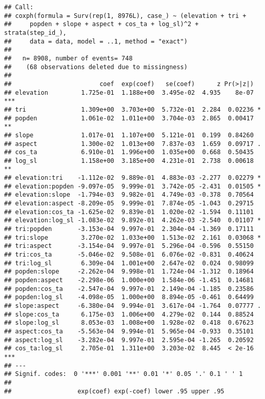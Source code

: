 \documentclass[
]{article}
\begin{document}
\begin{verbatim}
## Call:
## coxph(formula = Surv(rep(1, 8976L), case_) ~ (elevation + tri + 
##     popden + slope + aspect + cos_ta + log_sl)^2 + strata(step_id_), 
##     data = data, model = ..1, method = "exact")
## 
##   n= 8908, number of events= 748 
##    (68 observations deleted due to missingness)
## 
##                        coef  exp(coef)   se(coef)      z Pr(>|z|)    
## elevation         1.725e-01  1.188e+00  3.495e-02  4.935    8e-07 ***
## tri               1.309e+00  3.703e+00  5.732e-01  2.284  0.02236 *  
## popden            1.061e-02  1.011e+00  3.704e-03  2.865  0.00417 ** 
## slope             1.017e-01  1.107e+00  5.121e-01  0.199  0.84260    
## aspect            1.300e-02  1.013e+00  7.837e-03  1.659  0.09717 .  
## cos_ta            6.910e-01  1.996e+00  1.035e+00  0.668  0.50435    
## log_sl            1.158e+00  3.185e+00  4.231e-01  2.738  0.00618 ** 
## elevation:tri    -1.112e-02  9.889e-01  4.883e-03 -2.277  0.02279 *  
## elevation:popden -9.097e-05  9.999e-01  3.742e-05 -2.431  0.01505 *  
## elevation:slope  -1.794e-03  9.982e-01  4.749e-03 -0.378  0.70564    
## elevation:aspect -8.209e-05  9.999e-01  7.874e-05 -1.043  0.29715    
## elevation:cos_ta -1.625e-02  9.839e-01  1.020e-02 -1.594  0.11101    
## elevation:log_sl -1.083e-02  9.892e-01  4.262e-03 -2.540  0.01107 *  
## tri:popden       -3.153e-04  9.997e-01  2.304e-04 -1.369  0.17111    
## tri:slope         3.270e-02  1.033e+00  1.513e-02  2.161  0.03068 *  
## tri:aspect       -3.154e-04  9.997e-01  5.296e-04 -0.596  0.55150    
## tri:cos_ta       -5.046e-02  9.508e-01  6.076e-02 -0.831  0.40624    
## tri:log_sl        6.309e-04  1.001e+00  2.647e-02  0.024  0.98099    
## popden:slope     -2.262e-04  9.998e-01  1.724e-04 -1.312  0.18964    
## popden:aspect    -2.298e-06  1.000e+00  1.584e-06 -1.451  0.14681    
## popden:cos_ta    -2.547e-04  9.997e-01  2.149e-04 -1.185  0.23586    
## popden:log_sl    -4.098e-05  1.000e+00  8.894e-05 -0.461  0.64499    
## slope:aspect     -6.380e-04  9.994e-01  3.617e-04 -1.764  0.07777 .  
## slope:cos_ta      6.175e-03  1.006e+00  4.279e-02  0.144  0.88524    
## slope:log_sl      8.053e-03  1.008e+00  1.928e-02  0.418  0.67623    
## aspect:cos_ta    -5.563e-04  9.994e-01  5.965e-04 -0.933  0.35101    
## aspect:log_sl    -3.282e-04  9.997e-01  2.595e-04 -1.265  0.20592    
## cos_ta:log_sl     2.705e-01  1.311e+00  3.203e-02  8.445  < 2e-16 ***
## ---
## Signif. codes:  0 '***' 0.001 '**' 0.01 '*' 0.05 '.' 0.1 ' ' 1
## 
##                  exp(coef) exp(-coef) lower .95 upper .95

\end{verbatim}
\end{document}
